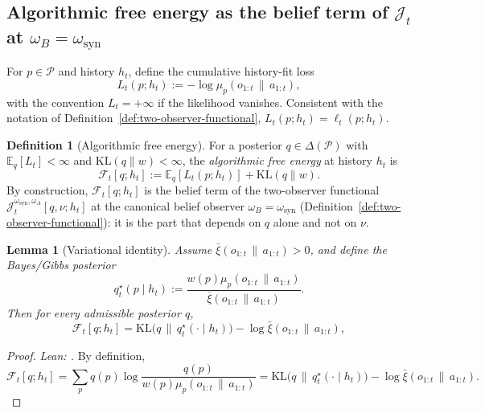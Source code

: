 \documentclass[11pt]{article}
\newtheorem{lemma}[theorem]{Lemma}
\theoremstyle{definition}
\newtheorem{definition}[theorem]{Definition}
\theoremstyle{remark}
\theoremstyle{plain}
\theoremstyle{definition}
\newcommand{\Pcal}{\mathcal{P}}
\newcommand{\Fcal}{\mathcal{F}}
\newcommand{\E}{\mathbb{E}}
\newcommand{\KL}{\mathrm{KL}}
\newcommand{\givena}{\,\|\,}
\newcommand{\ellp}{\ell}
\newcommand{\barxi}{\bar{\xi}}
\begin{document}
\subsection{Algorithmic free energy as the belief term of $\mathcal J_t$ at $\omega_B=\omega_{\mathrm{syn}}$}

For $p\in\Pcal$ and history $h_t$, define the cumulative history-fit loss
\[
L_t(p;h_t):=-\log\mu_p(o_{1:t}\givena a_{1:t}),
\]
with the convention $L_t=+\infty$ if the likelihood vanishes. Consistent with the notation of Definition~\ref{def:two-observer-functional}, $L_t(p;h_t)=\ellp_t(p;h_t)$.

\begin{definition}[Algorithmic free energy]
\label{def:afe}
For a posterior $q\in\Delta(\Pcal)$ with $\E_q[L_t]<\infty$ and $\KL(q\|w)<\infty$, the \emph{algorithmic free energy} at history $h_t$ is
\[
\Fcal_t[q;h_t]:=\E_q[L_t(p;h_t)]+\KL(q\|w).
\]
By construction, $\Fcal_t[q;h_t]$ is the belief term of the two-observer functional $\mathcal J_t^{\omega_{\mathrm{syn}},\omega_A}[q,\nu;h_t]$ at the canonical belief observer $\omega_B=\omega_{\mathrm{syn}}$ (Definition~\ref{def:two-observer-functional}): it is the part that depends on $q$ alone and not on $\nu$.
\end{definition}

\begin{lemma}[Variational identity]
\label{lem:variational}
Assume $\barxi(o_{1:t}\givena a_{1:t})>0$, and define the Bayes/Gibbs posterior
\[
q_t^\star(p\mid h_t):=\frac{w(p)\mu_p(o_{1:t}\givena a_{1:t})}{\barxi(o_{1:t}\givena a_{1:t})}.
\]
Then for every admissible posterior $q$,
\[
\Fcal_t[q;h_t]
=
\KL\!\bigl(q\,\|\,q_t^\star(\cdot\mid h_t)\bigr)-\log\barxi(o_{1:t}\givena a_{1:t}),
\]
\end{lemma}

\begin{proof}
\noindent\emph{Lean: .}
By definition,
\[
\Fcal_t[q;h_t]=\sum_p q(p)\log\frac{q(p)}{w(p)\mu_p(o_{1:t}\givena a_{1:t})}
=\KL\!\bigl(q\,\|\,q_t^\star(\cdot\mid h_t)\bigr)-\log\barxi(o_{1:t}\givena a_{1:t}).
\]
\end{proof}
\end{document}
